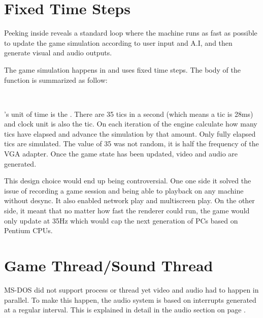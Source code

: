 \section{Fixed Time Steps}
Peeking inside  reveals a standard loop where the machine runs as fast as possible to update the game simulation according to user input and A.I, and then generate visual and audio outputs.\\
\par
{}
The game simulation happens in  and uses fixed time steps. The body of the function is summarized as follow:\\
\par
{}\\
\par
\doom's unit of time is the . There are 35 tics in a second (which means a tic is 28ms) and 
 clock unit is also the tic. On each iteration of  the engine calculate how many tics have elapsed and advance the simulation by that amount. Only fully elapsed tics are simulated. The value of 35 was not random, it is half the frequency of the VGA adapter. Once the game state has been updated, video and audio are generated.\\
\par
{}
\par
This design choice would end up being controversial. One one side it solved the issue of recording a game session and being able to playback on any machine without desync. It also enabled network play and multiscreen play. On the other side, it meant that no matter how fast the renderer could run, the game would only update at 35Hz which would cap the next generation of PCs based on Pentium CPUs.\\
\par



\section{Game Thread/Sound Thread}
MS-DOS did not support process or thread yet video and audio had to happen in parallel. To make this happen, the audio system is based on interrupts generated at a regular interval. This is explained in detail in the audio section on page \pageref{dmx_section}.\\








